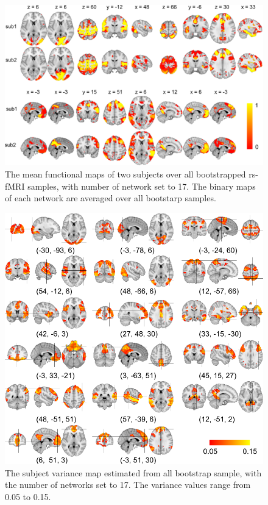 \documentclass[review,authoryear]{elsarticle}
\begin{document}
\begin{figure}
\includegraphics[width=1.0\textwidth]{figures/17networks/sub_mean}
\caption{The mean functional maps of two subjects over all bootstrapped rs-fMRI
  samples, with number of network set to 17. The binary maps of each network are
  averaged over all bootstarp samples.}
\end{figure}

\begin{figure}
\includegraphics[width=1.0\textwidth]{figures/17networks/sub_var}
\caption{The subject variance map estimated from all bootstrap sample, with the
  number of networks set to 17. The variance values range from 0.05 to 0.15. }
\end{figure}
\end{document}

